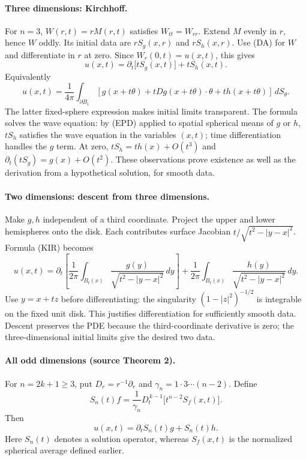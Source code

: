 \paragraph{Three dimensions: Kirchhoff.}
For $n=3$, $W(r,t)=rM(r,t)$ satisfies $W_{tt}=W_{rr}$.
Extend $M$ evenly in $r$, hence $W$ oddly. Its initial data are
$rS_g(x,r)$ and $rS_h(x,r)$.
Use (DA) for $W$ and differentiate in $r$ at zero.
Since $W_r(0,t)=u(x,t)$, this gives
\[
 u(x,t)=\partial_t\big[tS_g(x,t)\big]+tS_h(x,t).
 \tag{KIR}
\]
Equivalently
\[
 u(x,t)=\frac1{4\pi}\int_{\partial B_1}
 [g(x+t\theta)+tDg(x+t\theta)\cdot\theta+t h(x+t\theta)]\,dS_\theta.
\]
The latter fixed-sphere expression makes initial limits transparent.
The formula solves the wave equation: by (EPD) applied to spatial
spherical means of $g$ or $h$, $tS_h$ satisfies the wave equation
in the variables $(x,t)$; time differentiation handles the $g$ term.
At zero, $tS_h=t h(x)+O(t^3)$ and
$\partial_t(tS_g)=g(x)+O(t^2)$.
These observations prove existence as well as the derivation from a
hypothetical solution, for smooth data.

\paragraph{Two dimensions: descent from three dimensions.}
Make $g,h$ independent of a third coordinate.
Project the upper and lower hemispheres onto the disk. Each contributes
surface Jacobian $t/\sqrt{t^2-|y-x|^2}$.
Formula (KIR) becomes
\[
 u(x,t)=\partial_t\left[\frac1{2\pi}
          \int_{B_t(x)}\frac{g(y)}{\sqrt{t^2-|y-x|^2}}\,dy\right]
       +\frac1{2\pi}\int_{B_t(x)}
          \frac{h(y)}{\sqrt{t^2-|y-x|^2}}\,dy .
 \tag{W2}
\]
Use $y=x+tz$ before differentiating: the singularity
$(1-|z|^2)^{-1/2}$ is integrable on the fixed unit disk.
This justifies differentiation for sufficiently smooth data.
Descent preserves the PDE because the third-coordinate derivative is
zero; the three-dimensional initial limits give the desired two data.
\Needspace{45mm}

\paragraph{All odd dimensions (source Theorem 2).}
For $n=2k+1\geq3$, put $D_r=r^{-1}\partial_r$ and
$\gamma_n=1\cdot3\cdots(n-2)$. Define
\[
 S_n(t)f=\frac1{\gamma_n}D_t^{\,k-1}
                         \big[t^{n-2}S_f(x,t)\big].
\]
Then
\[
 u(x,t)=\partial_t S_n(t)g+S_n(t)h.
 \tag{WO}
\]
Here $S_n(t)$ denotes a solution operator, whereas $S_f(x,t)$ is the
normalized spherical average defined earlier.

